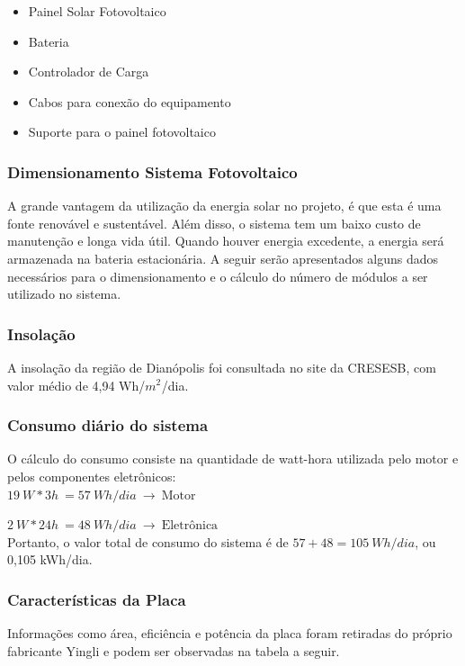 \begin{itemize}
    \item Painel Solar Fotovoltaico
    \item Bateria
    \item Controlador de Carga
    \item Cabos para conexão do equipamento
    \item Suporte para o painel fotovoltaico



\end{itemize}

\subsubsection{Dimensionamento Sistema Fotovoltaico}
A grande vantagem da utilização da energia solar no projeto, é que esta é uma fonte renovável e sustentável. Além disso, o sistema tem um baixo custo de manutenção e longa vida útil. Quando houver energia excedente, a energia será armazenada na bateria estacionária. A seguir serão apresentados alguns dados necessários para o dimensionamento e o cálculo do número de módulos a ser utilizado no sistema.


\subsubsection*{Insolação}

A insolação da região de Dianópolis foi consultada no site da CRESESB, com valor médio de 4,94 Wh/$m^{2^{}}$/dia.

\subsubsection*{Consumo diário do sistema}
O cálculo do consumo consiste na quantidade de watt-hora utilizada pelo motor e pelos componentes eletrônicos:
\\

$19~W*3h~=57~Wh/dia~\rightarrow~\text{Motor}$

$2~W*24h~=48~Wh/dia~\rightarrow~\text{Eletrônica}$
\\

Portanto, o valor total de consumo do sistema é de $57+48=105~Wh/dia$, ou 0,105 kWh/dia.

\subsubsection*{Características da Placa}
Informações como área, eficiência e potência da placa foram retiradas do próprio fabricante Yingli e podem ser observadas na tabela a seguir.

